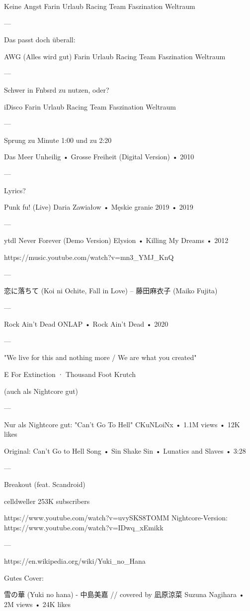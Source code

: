 Keine Angst
Farin Urlaub Racing Team
Faszination Weltraum

—

Das passt doch überall:

AWG (Alles wird gut)
Farin Urlaub Racing Team
Faszination Weltraum

—

Schwer in Fnbsrd zu nutzen, oder?

iDisco
Farin Urlaub Racing Team
Faszination Weltraum

—

Sprung zu Minute 1:00 und zu 2:20

Das Meer
Unheilig
 •
Grosse Freiheit (Digital Version)
 •
2010


—

Lyrics?


Punk fu! (Live)
Daria Zawiałow
 •
Męskie granie 2019
 •
2019


—

ytdl Never Forever (Demo Version)
Elysion
 •
Killing My Dreams
 •
2012

https://music.youtube.com/watch?v=mn3_YMJ_KnQ

—

恋に落ちて (Koi ni Ochite, Fall in Love) – 藤田麻衣子 (Maiko Fujita)

—

Rock Ain't Dead
ONLAP
 •
Rock Ain't Dead
 •
2020

—

"We live for this and nothing more / We are what you created"

E For Extinction · Thousand Foot Krutch

(auch als Nightcore gut)

—

Nur als Nightcore gut: "Can't Go To Hell"
CKuNLoiNx
 •
1.1M views
 •
12K likes

Original:
Can't Go to Hell
Song
 •
Sin Shake Sin
 •
Lunatics and Slaves
 •
3:28

—

Breakout (feat. Scandroid)

celldweller
253K subscribers

https://www.youtube.com/watch?v=uvySKS8TOMM
Nightcore-Version: https://www.youtube.com/watch?v=IDwq_xEmikk

—

https://en.wikipedia.org/wiki/Yuki_no_Hana

Gutes Cover:

雪の華 (Yuki no hana) - 中島美嘉 // covered by 凪原涼菜
Suzuna Nagihara
 •
2M views
 •
24K likes


